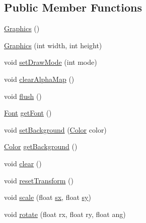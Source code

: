 \subsection*{Public Member Functions}
\begin{DoxyCompactItemize}
\item 
\mbox{\hyperlink{classorg_1_1newdawn_1_1slick_1_1_graphics_ab4edacd00331d6232b2b2ab72ee9600a}{Graphics}} ()
\item 
\mbox{\hyperlink{classorg_1_1newdawn_1_1slick_1_1_graphics_ab256b233dcf0217a0b4f0577d18b990e}{Graphics}} (int width, int height)
\item 
void \mbox{\hyperlink{classorg_1_1newdawn_1_1slick_1_1_graphics_a468e2501a15587e800ece5535eb72069}{set\+Draw\+Mode}} (int mode)
\item 
void \mbox{\hyperlink{classorg_1_1newdawn_1_1slick_1_1_graphics_a105163751bd22bbd21569c17e1753671}{clear\+Alpha\+Map}} ()
\item 
void \mbox{\hyperlink{classorg_1_1newdawn_1_1slick_1_1_graphics_aef2136ee874864cef4886ad15485b79f}{flush}} ()
\item 
\mbox{\hyperlink{interfaceorg_1_1newdawn_1_1slick_1_1_font}{Font}} \mbox{\hyperlink{classorg_1_1newdawn_1_1slick_1_1_graphics_af9f0de1e447b9b89efa43908b4ace819}{get\+Font}} ()
\item 
void \mbox{\hyperlink{classorg_1_1newdawn_1_1slick_1_1_graphics_a792bcb1d729c35041b99b9eb2211649a}{set\+Background}} (\mbox{\hyperlink{classorg_1_1newdawn_1_1slick_1_1_color}{Color}} color)
\item 
\mbox{\hyperlink{classorg_1_1newdawn_1_1slick_1_1_color}{Color}} \mbox{\hyperlink{classorg_1_1newdawn_1_1slick_1_1_graphics_ad7f14cb9fa8316e632996051a8a2576d}{get\+Background}} ()
\item 
void \mbox{\hyperlink{classorg_1_1newdawn_1_1slick_1_1_graphics_ac02dc23222f4d0d1498f38e27bf96a49}{clear}} ()
\item 
void \mbox{\hyperlink{classorg_1_1newdawn_1_1slick_1_1_graphics_af9c31d95040f9acd36eaa449c33e5c12}{reset\+Transform}} ()
\item 
void \mbox{\hyperlink{classorg_1_1newdawn_1_1slick_1_1_graphics_a1eb01ca52c2eebfb0ceab9edfb90cfd1}{scale}} (float \mbox{\hyperlink{classorg_1_1newdawn_1_1slick_1_1_graphics_a4678c53357b785b1af9ea7a163f65dd1}{sx}}, float \mbox{\hyperlink{classorg_1_1newdawn_1_1slick_1_1_graphics_a8bf991be4929bf3257a80d0176c472a1}{sy}})
\item 
void \mbox{\hyperlink{classorg_1_1newdawn_1_1slick_1_1_graphics_a1c6c88bdd93fac0bb4a6d5438ccf1499}{rotate}} (float rx, float ry, float ang)

\end{DoxyCompactItemize}
